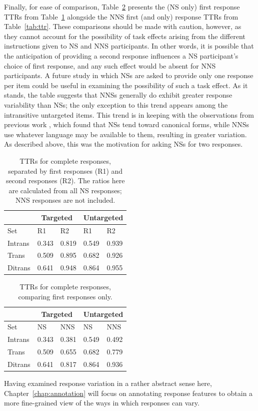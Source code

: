 Finally, for ease of comparison, Table~\ref{tab:ttr1v1} presents the (NS only) first response TTRs from Table~\ref{tab:ttr1v2} alongside the NNS first (and only) response TTRs from Table~\ref{tab:ttr}. These comparisons should be made with caution, however, as they cannot account for the possibility of task effects arising from the different instructions given to NS and NNS participants. In other words, it is possible that the anticipation of providing a second response influences a NS participant's choice of first response, and any such effect would be absent for NNS participants. A future study in which NSs are asked to provide only one response per item could be useful in examining the possibility of such a task effect. As it stands, the table suggests that NNSs generally do exhibit greater response variability than NSs; the only exception to this trend appears among the intransitive untargeted items. This trend is in keeping with the observations from previous work \citep{king:dickinson:13}, which found that NSs tend toward canonical forms, while NNSs use whatever language may be available to them, resulting in greater variation. As described above, this was the motivation for asking NSs for two responses.

\begin{table}[h!]
\begin{center}
\begin{tabular}{|l||l|l||l|l|}
\hline
 & \multicolumn{2}{|c||}{Targeted} & \multicolumn{2}{|c|}{Untargeted} \\
\hline
 Set & R1 & R2 & R1 & R2 \\
\hline
\hline
Intrans & 0.343 & 0.819 & 0.549 & 0.939 \\
\hline
Trans & 0.509 & 0.895 & 0.682 & 0.926 \\ %
\hline
Ditrans & 0.641 & 0.948 & 0.864 & 0.955  \\ 
\hline
\end{tabular}
\caption{\label{tab:ttr1v2} TTRs for complete responses, separated by first responses (R1) and second responses (R2). The ratios here are calculated from all NS responses; NNS responses are not included.}
\end{center}
\end{table}

\begin{table}[h!]
\begin{center}
\begin{tabular}{|l||l|l||l|l|}
\hline
 & \multicolumn{2}{|c||}{Targeted} & \multicolumn{2}{|c|}{Untargeted} \\
\hline
 Set & NS & NNS & NS & NNS \\
\hline
\hline
Intrans & 0.343 & 0.381 & 0.549 & 0.492 \\
\hline
Trans & 0.509 & 0.655 & 0.682 & 0.779 \\ %
\hline
Ditrans & 0.641 & 0.817 & 0.864 & 0.936  \\ 
\hline
\end{tabular}
\caption{\label{tab:ttr1v1} TTRs for complete responses, comparing first responses only.}
\end{center}
\end{table}

Having examined response variation in a rather abstract sense here, Chapter~\ref{chap:annotation} will focus on annotating response features to obtain a more fine-grained view of the ways in which responses can vary.

